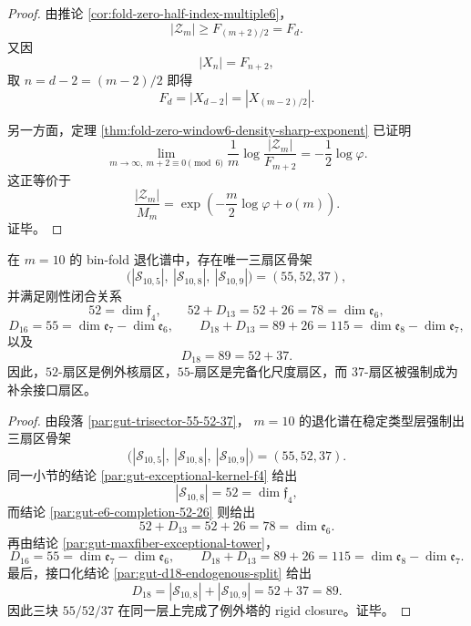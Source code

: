\begin{proof}
由推论 \ref{cor:fold-zero-half-index-multiple6}，
\[
|\mathcal Z_m|
\ge
F_{(m+2)/2}
=
F_d.
\]
又因
\[
|X_n|=F_{n+2},
\]
取 \(n=d-2=(m-2)/2\) 即得
\[
F_d=|X_{d-2}|=|X_{(m-2)/2}|.
\]

另一方面，定理 \ref{thm:fold-zero-window6-density-sharp-exponent} 已证明
\[
\lim_{m\to\infty,\ m+2\equiv 0\!\!\!\pmod 6}
\frac{1}{m}\log\frac{|\mathcal Z_m|}{F_{m+2}}
=
-\frac12\log\varphi.
\]
这正等价于
\[
\frac{|\mathcal Z_m|}{M_m}
=
\exp\!\left(-\frac{m}{2}\log\varphi+o(m)\right).
\]
证毕。
\end{proof}

\begin{theorem}\label{thm:derived-window10-exceptional-trisector-rigid-closure}
在 \(m=10\) 的 bin-fold 退化谱中，存在唯一三扇区骨架
\[
\bigl(|\mathcal S_{10,5}|,\ |\mathcal S_{10,8}|,\ |\mathcal S_{10,9}|\bigr)=(55,52,37),
\]
并满足刚性闭合关系
\[
52=\dim\mathfrak f_4,
\qquad
52+D_{13}=52+26=78=\dim\mathfrak e_6,
\]
\[
D_{16}=55=\dim\mathfrak e_7-\dim\mathfrak e_6,
\qquad
D_{18}+D_{13}=89+26=115=\dim\mathfrak e_8-\dim\mathfrak e_7,
\]
以及
\[
D_{18}=89=52+37.
\]
因此，\(52\)-扇区是例外核扇区，\(55\)-扇区是完备化尺度扇区，而 \(37\)-扇区被强制成为补余接口扇区。
\end{theorem}

\begin{proof}
由段落 \ref{par:gut-trisector-55-52-37}，
\(m=10\) 的退化谱在稳定类型层强制出三扇区骨架
\[
\bigl(|\mathcal S_{10,5}|,\ |\mathcal S_{10,8}|,\ |\mathcal S_{10,9}|\bigr)=(55,52,37).
\]
同一小节的结论 \ref{par:gut-exceptional-kernel-f4} 给出
\[
|\mathcal S_{10,8}|=52=\dim\mathfrak f_4,
\]
而结论 \ref{par:gut-e6-completion-52-26} 则给出
\[
52+D_{13}=52+26=78=\dim\mathfrak e_6.
\]
再由结论 \ref{par:gut-maxfiber-exceptional-tower}，
\[
D_{16}=55=\dim\mathfrak e_7-\dim\mathfrak e_6,
\qquad
D_{18}+D_{13}=89+26=115=\dim\mathfrak e_8-\dim\mathfrak e_7.
\]
最后，接口化结论 \ref{par:gut-d18-endogenous-split} 给出
\[
D_{18}=|\mathcal S_{10,8}|+|\mathcal S_{10,9}|=52+37=89.
\]
因此三块 \(55/52/37\) 在同一层上完成了例外塔的 rigid closure。证毕。
\end{proof}

